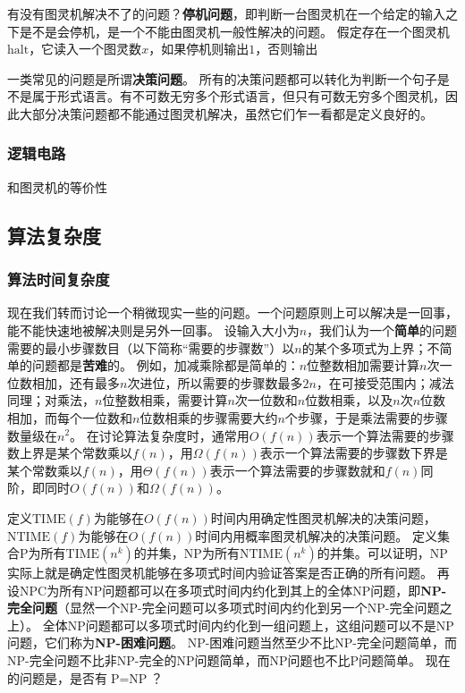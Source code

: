 \documentclass[UTF8, a4paper]{ctexart}
\begin{document}
有没有图灵机解决不了的问题？\textbf{停机问题}，即判断一台图灵机在一个给定的输入之下是不是会停机，是一个不能由图灵机一般性解决的问题。
假定存在一个图灵机$\text{halt}$，它读入一个图灵数$x$，如果停机则输出$1$，否则输出

一类常见的问题是所谓\textbf{决策问题}。%
所有的决策问题都可以转化为判断一个句子是不是属于形式语言。有不可数无穷多个形式语言，但只有可数无穷多个图灵机，因此大部分决策问题都不能通过图灵机解决，虽然它们乍一看都是定义良好的。

\subsubsection{逻辑电路}

和图灵机的等价性

\subsection{算法复杂度}

\subsubsection{算法时间复杂度}

现在我们转而讨论一个稍微现实一些的问题。一个问题原则上可以解决是一回事，能不能快速地被解决则是另外一回事。
设输入大小为$n$，我们认为一个\textbf{简单}的问题需要的最小步骤数目（以下简称“需要的步骤数”）以$n$的某个多项式为上界；不简单的问题都是\textbf{苦难}的。
例如，加减乘除都是简单的：$n$位整数相加需要计算$n$次一位数相加，还有最多$n$次进位，所以需要的步骤数最多$2n$，在可接受范围内；减法同理；对乘法，$n$位整数相乘，需要计算$n$次一位数和$n$位数相乘，以及$n$次$n$位数相加，而每个一位数和$n$位数相乘的步骤需要大约$n$个步骤，于是乘法需要的步骤数量级在$n^2$。
在讨论算法复杂度时，通常用$O(f(n))$表示一个算法需要的步骤数上界是某个常数乘以$f(n)$，用$\Omega(f(n))$表示一个算法需要的步骤数下界是某个常数乘以$f(n)$，用$\Theta(f(n))$表示一个算法需要的步骤数就和$f(n)$同阶，即同时$O(f(n))$和$\Omega(f(n))$。

定义$\text{TIME}(f)$为能够在$O(f(n))$时间内用确定性图灵机解决的决策问题，$\text{NTIME}(f)$为能够在$O(f(n))$时间内用概率图灵机解决的决策问题。
定义集合$\text{P}$为所有$\text{TIME}(n^k)$的并集，$\text{NP}$为所有$\text{NTIME}(n^k)$的并集。可以证明，$\text{NP}$实际上就是确定性图灵机能够在多项式时间内验证答案是否正确的所有问题。
再设$\text{NPC}$为所有$\text{NP}$问题都可以在多项式时间内约化到其上的全体NP问题，即\textbf{NP-完全问题}（显然一个NP-完全问题可以多项式时间内约化到另一个NP-完全问题之上）。
全体$\text{NP}$问题都可以多项式时间内约化到一组问题上，这组问题可以不是NP问题，它们称为\textbf{NP-困难问题}。
NP-困难问题当然至少不比NP-完全问题简单，而NP-完全问题不比非NP-完全的NP问题简单，而NP问题也不比P问题简单。
现在的问题是，是否有$\text{P}=\text{NP}$？
\end{document}
